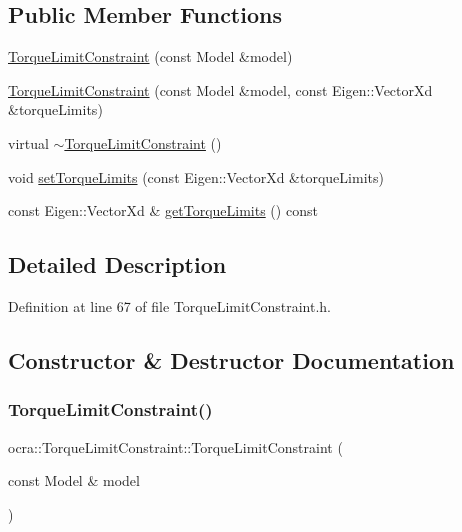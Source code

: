\subsection*{Public Member Functions}
\begin{DoxyCompactItemize}
\item 
\hyperlink{classocra_1_1TorqueLimitConstraint_ac1d452a8e42d05489ab0b16c9abbba0b}{Torque\+Limit\+Constraint} (const Model \&model)
\item 
\hyperlink{classocra_1_1TorqueLimitConstraint_adf43adabb40dc149d609b219fe8b7ac0}{Torque\+Limit\+Constraint} (const Model \&model, const Eigen\+::\+Vector\+Xd \&torque\+Limits)
\item 
virtual \hyperlink{classocra_1_1TorqueLimitConstraint_a893e34cf1ab2a6faf59bf394e769bbe3}{$\sim$\+Torque\+Limit\+Constraint} ()
\item 
void \hyperlink{classocra_1_1TorqueLimitConstraint_aae5d3c15e07731fb19f2f55b45852554}{set\+Torque\+Limits} (const Eigen\+::\+Vector\+Xd \&torque\+Limits)
\item 
const Eigen\+::\+Vector\+Xd \& \hyperlink{classocra_1_1TorqueLimitConstraint_a34f89a0c633bf6a8cabf79f9d6d22871}{get\+Torque\+Limits} () const
\end{DoxyCompactItemize}


\subsection{Detailed Description}


Definition at line 67 of file Torque\+Limit\+Constraint.\+h.



\subsection{Constructor \& Destructor Documentation}
\hypertarget{classocra_1_1TorqueLimitConstraint_ac1d452a8e42d05489ab0b16c9abbba0b}{}\label{classocra_1_1TorqueLimitConstraint_ac1d452a8e42d05489ab0b16c9abbba0b} 
\subsubsection{\texorpdfstring{Torque\+Limit\+Constraint()}{TorqueLimitConstraint()}\hspace{0.1cm}{\footnotesize\ttfamily [1/2]}}
{\footnotesize\ttfamily ocra\+::\+Torque\+Limit\+Constraint\+::\+Torque\+Limit\+Constraint (\begin{DoxyParamCaption}\item[{const Model \&}]{model }\end{DoxyParamCaption})\hspace{0.3cm}{\ttfamily [inline]}}



